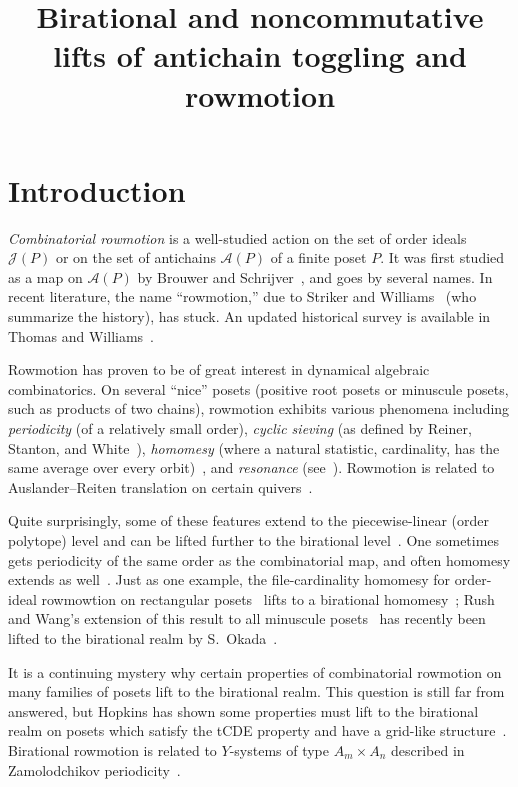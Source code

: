\documentclass[ALCO,ThmDefs,Unicode,epreuves]{cedram}
\author{\firstname{Michael} \lastname{Joseph}}
\author{\firstname{Tom} \lastname{Roby}}
\title[Birational and noncommutative antichain rowmotion]%
{Birational and noncommutative lifts of antichain toggling and rowmotion}
\newcommand{\cala}{\mathcal{A}}
\newcommand{\calj}{\mathcal{J}}
\begin{document}
\maketitle

\section{Introduction}\label{sec:intro}

\textit{Combinatorial rowmotion} is a well-studied action on the set of order ideals
$\calj(P)$ or on the set of antichains $\cala(P)$ of a finite poset $P$. 
It was first studied as a map on $\cala(P)$
by Brouwer and Schrijver~\cite{brouwer1974period}, and goes by several names. In recent literature, the name 
``rowmotion,'' due to Striker and Williams~\cite{strikerwilliams} (who summarize the
history), has stuck. An updated historical survey is available in Thomas and
Williams~\cite[\S~7]{rowmotion-in-slow-motion}.

Rowmotion has proven to be of great interest in dynamical algebraic combinatorics. On
several ``nice'' posets (\eg positive root posets or minuscule posets, such as products of
two chains), rowmotion exhibits various phenomena including \emph{periodicity} (of a relatively
small order), \emph{cyclic sieving} (as defined by Reiner, Stanton, and White~\cite{csp}),
\emph{homomesy} (where a natural statistic, \eg cardinality, has the same average over every
orbit)~\cite{ast,shahrzad,indepsetspaper,panyushev,propproby,rush-wang-homomesy-minuscule,vorland-thesis,vorland-3-chains},
and \emph{resonance} (see~\cite{dpsresonance,dilks-striker-vorland}).
Rowmotion is related to Auslander--Reiten translation on certain quivers~\cite{Yil17}. 

Quite surprisingly, some of these features extend to the piecewise-linear (order polytope)
level and can be lifted further to the birational level~\cite{einpropp}. One sometimes
gets periodicity of the same order as the combinatorial map, and often homomesy extends as
well~\cite{GrRo15,GrRo16,musiker-roby}. Just as one example, the file-cardinality homomesy
for order-ideal rowmowtion on rectangular posets~\cite[Thm.~19ff]{propproby} lifts to a birational
homomesy~\cite[Thm.~2.16]{musiker-roby}; Rush and Wang's extension of this result to all minuscule
posets~\cite[Thm.~1.2]{rush-wang-homomesy-minuscule} has recently been lifted to the birational
realm by S.~Okada~\cite{okada-minuscule}.


It is a continuing mystery why certain properties of combinatorial rowmotion on
many families of posets lift to the birational realm.
This question is still far from answered, but Hopkins has shown
some properties must lift to the birational realm on posets which satisfy the tCDE property and have a grid-like structure~\cite{hopkins2019minuscule}.
Birational rowmotion is related to $Y$-systems of type $A_m \times A_n$ described in
Zamolodchikov periodicity~\cite[\S~4.4]{robydac}.
\end{document}
